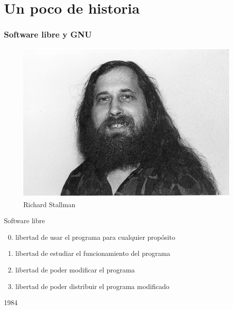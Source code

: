 \documentclass[hyperref={colorlinks}]{beamer}
\begin{document}
\section{Un poco de historia}
\begin{frame}
    \frametitle{Software libre y GNU}

    \begin{minipage}{.4\linewidth}
    \begin{figure}
    \includegraphics[width=.9\linewidth]{figs/rms.jpeg}
    \caption{Richard Stallman}
    \end{figure}
    \end{minipage}
    \pause
    \begin{minipage}{.55\linewidth}
    \begin{block}{Software libre}
        \begin{enumerate}
        \setcounter{enumi}{-1}
        \item libertad de usar el programa para cualquier prop\'osito
        \item libertad de estudiar el funcionamiento del programa
        \item libertad de poder modificar el programa
        \item libertad de poder distribuir el programa modificado
        \end{enumerate}
    \end{block}
    \pause
    \begin{block}{1984}
        \begin{minipage}{.2\linewidth}

\end{minipage}
\end{block}
\end{minipage}
\end{frame}
\end{document}

